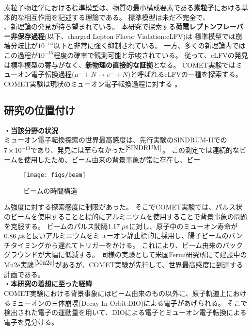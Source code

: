 \documentclass[11pt,a4j,dvipdfmx]{jarticle} 					%
\newcommand{\研究課題名}{ミューオン電子転換探索の感度向上に向けた解析手法の開発}
\newcommand{\研究機関名}{大阪大学}
\newcommand{\研究代表者氏名}{高見 翔太   }
\newcommand{\mysubsection}[1]{\vspace{-20pt}\subsection*{\colorbox{cyan!15}{\normalsize{#1}}}\vspace{-0.2cm}}
\begin{document}
素粒子物理学における標準模型は、物質の最小構成要素である\textbf{素粒子}における基本的な相互作用を記述する理論である。
標準模型は未だ不完全で、\\
、新理論の発見が待ち望まれている。
本研究で探索する\textbf{荷電レプトンフレーバー非保存過程}(以下、charged Lepton Flavor Violation:cLFV)は
標準模型では崩壊分岐比が$10^{-54}$以下と非常に強く抑制されている。
一方、多くの新理論内ではこの過程が$10^{-15}$程度の確率で観測可能と示唆されている。
従って、cLFVの発見は標準模型の寄与がなく、\textbf{新物理の直接的な証拠}となる。
COMET実験ではミューオン電子転換過程($\mu^- + N \rightarrow e^- + N$)と呼ばれるcLFVの一種を探索する。
COMET実験は現状のミューオン電子転換過程に対する 。
\mysubsection{研究の位置付け}
\noindent \textbf{・当該分野の状況}\\
ミューオン電子転換探索の世界最高感度は、先行実験のSINDRUM-I\hspace{-1.2pt}Iでの$7 \times 10^{-13}$であり、発見には至らなかった$^{\cite{SINDRUM}}$。
この測定では連続的なビームを使用したため、ビーム由来の背景事象が常に存在し、ビー
\begin{wrapfigure}[9]{r}{190pt}{}
	\centering
	 \vspace{-0.5cm}
	 \hspace*{-15pt}
	 \texttt{[image: figs/beam]}
	 \vspace{-1.2cm}
	 \caption{\small{ビームの時間構造}}
	 \label{Fig:beam}
	\end{wrapfigure} 
ム強度に対する探索感度に制限があった。
そこでCOMET実験では、パルス状のビームを使用することと標的にアルミニウムを使用することで背景事象の問題を克服する。
ビームのパルス間隔$1.17\;\rm{\mu s}$に対し、原子中のミューオン寿命が$0.86\;\rm{\mu s}$と長いアルミニウムをミューオン静止標的に採用し、陽子ビームのバンチタイミングから遅れてトリガーをかける。
これにより、ビーム由来のバックグラウンドが大幅に低減する。
同様の実験として米国Fermi研究所にて建設中のMu2e実験$^{\cite{Mu2e}}$があるが、COMET実験が先行して、世界最高感度に到達する計画である。\\
\noindent \textbf{・本研究の着想に至った経緯}\\
COMET実験における背景事象にはビーム由来のもの以外に、原子軌道上におけるミューオンの三体崩壊(Decay In Orbit:DIO)による電子があげられる。
そこで検出された電子の運動量を用いて、DIOによる電子とミューオン電子転換による電子を見分ける。
\end{document}
